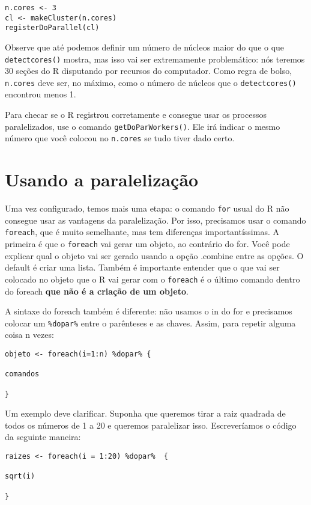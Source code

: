 \documentclass[]{book}
\begin{document}
\begin{verbatim}
n.cores <- 3
cl <- makeCluster(n.cores)
registerDoParallel(cl)
\end{verbatim}

Observe que até podemos definir um número de núcleos maior do que o que
\texttt{detectcores()} mostra, mas isso vai ser extremamente
problemático: nós teremos 30 seções do R disputando por recursos do
computador. Como regra de bolso, \texttt{n.cores} deve ser, no máximo,
como o número de núcleos que o \texttt{detectcores()} encontrou menos 1.

Para checar se o R registrou corretamente e consegue usar os processos
paralelizados, use o comando \texttt{getDoParWorkers()}. Ele irá indicar
o mesmo número que você colocou no \texttt{n.cores} se tudo tiver dado
certo.

\section{Usando a paralelização}\label{usando-a-paralelizacao}

Uma vez configurado, temos mais uma etapa: o comando \texttt{for} usual
do R não consegue usar as vantagens da paralelização. Por isso,
precisamos usar o comando \texttt{foreach}, que é muito semelhante, mas
tem diferenças importantíssimas. A primeira é que o \texttt{foreach} vai
gerar um objeto, ao contrário do for. Você pode explicar qual o objeto
vai ser gerado usando a opção .combine entre as opções. O default é
criar uma lista. Também é importante entender que o que vai ser colocado
no objeto que o R vai gerar com o \texttt{foreach} é o último comando
dentro do foreach \textbf{que não é a criação de um objeto}.

A sintaxe do foreach também é diferente: não usamos o in do for e
precisamos colocar um \texttt{\%dopar\%} entre o parênteses e as chaves.
Assim, para repetir alguma coisa n vezes:

\begin{verbatim}
objeto <- foreach(i=1:n) %dopar% {

comandos

}
\end{verbatim}

Um exemplo deve clarificar. Suponha que queremos tirar a raiz quadrada
de todos os números de 1 a 20 e queremos paralelizar isso. Escreveríamos
o código da seguinte maneira:

\begin{verbatim}
raizes <- foreach(i = 1:20) %dopar%  {

sqrt(i)

}
\end{verbatim}
\end{document}
